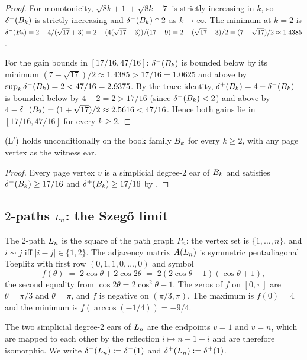 \begin{proof}
For monotonicity, $\sqrt{8k+1} + \sqrt{8k-7}$ is strictly increasing in
$k$, so $\delta^{-}(B_{k})$ is strictly increasing and $\delta^{-}(B_{k}) \uparrow 2$
as $k \to \infty$. The minimum at $k = 2$ is
$\delta^{-}(B_{2}) = 2 - 4/(\sqrt{17} + 3) = 2 - (4(\sqrt{17} - 3))/(17 - 9)
= 2 - (\sqrt{17} - 3)/2 = (7 - \sqrt{17})/2 \approx 1.4385$.

For the gain bounds in $[17/16, 47/16]$: $\delta^{-}(B_{k})$ is bounded below
by its minimum $(7 - \sqrt{17})/2 \approx 1.4385 > 17/16 = 1.0625$ and
above by $\sup_{k} \delta^{-}(B_{k}) = 2 < 47/16 = 2.9375$. By the trace
identity, $\delta^{+}(B_{k}) = 4 - \delta^{-}(B_{k})$ is bounded below by
$4 - 2 = 2 > 17/16$ (since $\delta^{-}(B_{k}) < 2$) and above by
$4 - \delta^{-}(B_{2}) = (1 + \sqrt{17})/2 \approx 2.5616 < 47/16$. Hence
both gains lie in $[17/16, 47/16]$ for every $k \ge 2$.
\end{proof}

\begin{corollary}\label{cor:books-Lprime}
$(\mathrm{L}')$ holds unconditionally on the book family $B_{k}$ for every
$k \ge 2$, with any page vertex as the witness ear.
\end{corollary}

\begin{proof}
Every page vertex $v$ is a simplicial degree-$2$ ear of $B_{k}$ and
satisfies $\delta^{-}(B_{k}) \ge 17/16$ and $\delta^{+}(B_{k}) \ge 17/16$ by
.
\end{proof}

\subsection{$2$-paths \texorpdfstring{$L_{n}$}{L\_n}: the Szeg\H{o} limit}\label{sec:subfamily:2path-szego}

The $2$-path $L_{n}$ is the square of the path graph $P_{n}$: the vertex
set is $\{1, \ldots, n\}$, and $i \sim j$ iff $|i - j| \in \{1, 2\}$.
The adjacency matrix $A(L_{n})$ is symmetric pentadiagonal Toeplitz
with first row $(0, 1, 1, 0, \ldots, 0)$ and symbol
\[
f(\theta) \;=\; 2 \cos\theta + 2 \cos 2\theta \;=\; 2(2\cos\theta - 1)(\cos\theta + 1),
\]
the second equality from $\cos 2\theta = 2\cos^{2}\theta - 1$. The
zeros of $f$ on $[0, \pi]$ are $\theta = \pi/3$ and $\theta = \pi$, and
$f$ is negative on $(\pi/3, \pi)$. The maximum is $f(0) = 4$ and the
minimum is $f(\arccos(-1/4)) = -9/4$.

The two simplicial degree-$2$ ears of $L_{n}$ are the endpoints $v = 1$
and $v = n$, which are mapped to each other by the reflection
$i \mapsto n + 1 - i$ and are therefore isomorphic. We write
$\delta^{-}(L_{n}) := \delta^{-}(1)$ and $\delta^{+}(L_{n}) := \delta^{+}(1)$.

